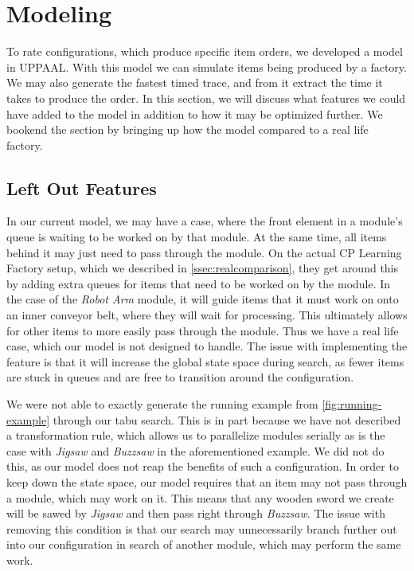 \section{Modeling}\label{sec:modeling}
To rate configurations, which produce specific item orders, we developed a model in UPPAAL. With this model we can simulate items being produced by a factory. We may also generate the fastest timed trace, and from it extract the time it takes to produce the order. In this section, we will discuss what features we could have added to the model in addition to how it may be optimized further. We bookend the section by bringing up how the model compared to a real life factory. 

\subsection{Left Out Features}\label{ssec:LOFeatures}
In our current model, we may have a case, where the front element in a module's queue is waiting to be worked on by that module. At the same time, all items behind it may just need to pass through the module. On the actual CP Learning Factory setup, which we described in \cref{ssec:realcomparison}, they get around this by adding extra queues for items that need to be worked on by the module. In the case of the \textit{Robot Arm} module, it will guide items that it must work on onto an inner conveyor belt, where they will wait for processing. This ultimately allows for other items to more easily pass through the module. Thus we have a real life case, which our model is not designed to handle. The issue with implementing the feature is that it will increase the global state space during search, as fewer items are stuck in queues and are free to transition around the configuration. 

We were not able to exactly generate the running example from \cref{fig:running-example} through our tabu search. This is in part because we have not described a transformation rule, which allows us to parallelize modules serially as is the case with \textit{Jigsaw} and \textit{Buzzsaw} in the aforementioned example. We did not do this, as our model does not reap the benefits of such a configuration. In order to keep down the state space, our model requires that an item may not pass through a module, which may work on it. This means that any wooden sword we create will be sawed by \textit{Jigsaw} and then pass right through \textit{Buzzsaw}. The issue with removing this condition is that our search may unnecessarily branch further out into our configuration in search of another module, which may perform the same work.

